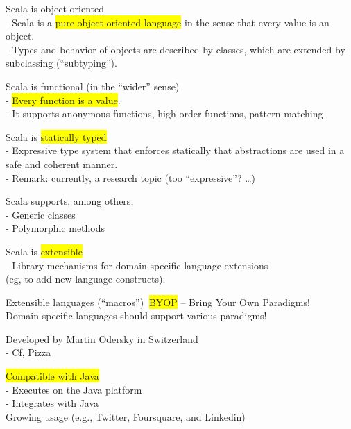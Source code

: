\documentclass[tikz,border=10pt]{project_plan}
\begin{document}
Scala is object-oriented\\
- Scala is a \colorbox{yellow}{pure object-oriented language} in the sense that
every value is an object.\\
- Types and behavior of objects are described by classes,
which are extended by subclassing (“subtyping”).

Scala is functional (in the “wider” sense)\\
- \colorbox{yellow}{Every function is a value}.\\
- It supports anonymous functions, high-order functions,
pattern matching

Scala is \colorbox{yellow}{statically typed}\\
- Expressive type system that enforces statically that
abstractions are used in a safe and coherent manner.\\
- Remark: currently, a research topic (too “expressive”? …)

Scala supports, among others,\\
- Generic classes\\
- Polymorphic methods

Scala is \colorbox{yellow}{extensible}\\
- Library mechanisms for domain-specific language extensions\\
(eg, to add new language constructs).

Extensible languages (“macros”) \MVRightArrow$\ $\colorbox{yellow}{BYOP} – Bring Your Own Paradigms!\\
Domain-specific languages should support various paradigms!

Developed by Martin Odersky in Switzerland\\
- Cf, Pizza

\colorbox{yellow}{Compatible with Java}\\
- Executes on the Java platform\\
- Integrates with Java\\
Growing usage (e.g., Twitter, Foursquare, and Linkedin)
\end{document}
